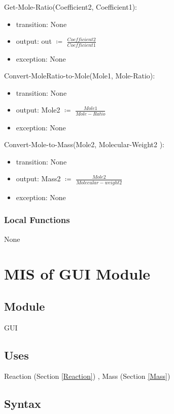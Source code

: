 \documentclass[12pt, titlepage]{article}
\begin{document}
\noindent Get-Mole-Ratio(Coefficient2, Coefficient1):
\begin{itemize}
\item transition: None
\item output: out $\coloneqq$ $\frac{Coefficient2}{Coefficient1}$
\item exception: None 
\end{itemize}

\noindent Convert-MoleRatio-to-Mole(Mole1, Mole-Ratio):
\begin{itemize}
\item transition: None
\item output:  Mole2 $\coloneqq$ $\frac{Mole1}{Mole-Ratio}$
\item exception: None 
\end{itemize}

\noindent Convert-Mole-to-Mass(Mole2, Molecular-Weight2 ):
\begin{itemize}
\item transition: None
\item output:  Mass2 $\coloneqq$ $\frac{Mole2}{Molecular-weight2}$
\item exception: None 
\end{itemize}

\subsubsection{Local Functions}
None

\newpage

\section{MIS of GUI Module} \label{display} 

\subsection{Module}

GUI 

\subsection{Uses}

Reaction (Section \ref{Reaction}) , Mass (Section \ref{Mass})


\subsection{Syntax}
\end{document}
